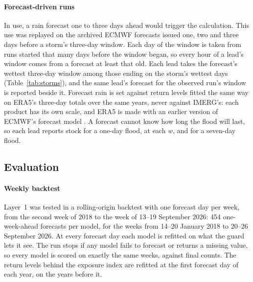 \paragraph{Forecast-driven runs}
In use, a rain forecast one to three days ahead would trigger the calculation. This use was
replayed on the archived ECMWF forecasts issued one, two and three days before a storm's
three-day window. Each day of the window is taken from runs started that many days before the
window began, so every hour of a lead's window comes from a forecast at least that old. Each
lead takes the forecast's wettest three-day window among those ending on the storm's wettest
days (Table~\ref{tab:storms}), and the same lead's forecast for the observed run's window is
reported beside it. Forecast rain is set
against return levels fitted the same way on ERA5's three-day totals over the same years, never
against IMERG's: each product has its own scale, and ERA5 is made with an earlier version of
ECMWF's forecast model \parencite{hersbach2020}. A forecast cannot know how long the flood will
last, so each lead reports stock for a one-day flood, at each $w$, and for a seven-day flood.

\subsection{Evaluation}\label{sec:evaluation}

\paragraph{Weekly backtest}
Layer~1 was tested in a rolling-origin backtest with one forecast day per week, from the second
week of 2018 to the week of 13--19 September 2026: 454 one-week-ahead forecasts per model, for the
weeks from 14--20 January 2018 to 20--26 September 2026. At every forecast day each model is
refitted on what the guard lets it see. The run stops if any model fails to forecast or returns a
missing value, so every model is scored on exactly the same weeks, against final counts. The
return levels behind the exposure index are refitted at the first forecast day of each year, on
the years before it.

